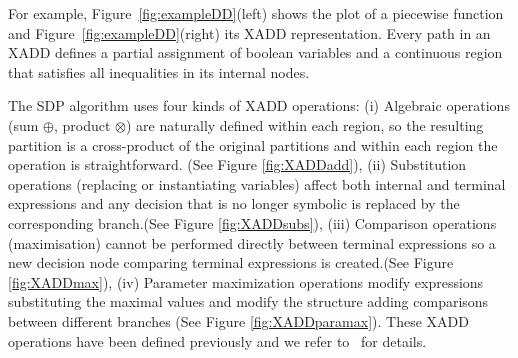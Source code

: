 For example, Figure~\ref{fig:exampleDD}(left) shows the plot of a piecewise function and Figure~\ref{fig:exampleDD}(right) its XADD representation.
Every path in an XADD defines a partial assignment of boolean variables and a continuous region that satisfies all inequalities in its internal nodes.

The SDP algorithm uses four kinds of XADD operations: (i) Algebraic operations (sum $\oplus$, product $\otimes$) are naturally defined within each region, so the resulting partition is a cross-product of the original partitions and within each region the operation is straightforward. (See Figure \ref{fig:XADDadd}), (ii) Substitution operations (replacing or instantiating variables) affect both internal and terminal expressions and any decision that is no longer symbolic is replaced by the corresponding branch.(See Figure \ref{fig:XADDsubs}),
(iii) Comparison operations (maximisation) cannot be performed directly between terminal expressions so a new decision node comparing terminal expressions is created.(See Figure \ref{fig:XADDmax}),
(iv) Parameter maximization operations modify expressions substituting the maximal values and modify the structure adding comparisons between different branches (See Figure \ref{fig:XADDparamax}).
These XADD operations have been defined previously and we refer to~\cite{sanner11,zamani12} for details.
